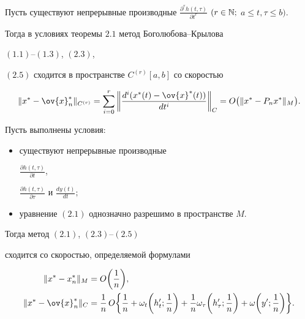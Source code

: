 \begin{thms}


Пусть существуют непрерывные производные $\frac{\partial^r h(t,\tau)}


{\partial t^r}$ $(r\in \bl{N};$ $a\leq t,\tau\leq b)$.


Тогда в условиях теоремы $2.1$ метод Боголюбова--Крылова


$(1.1)$--$(1.3)$, $(2.3)$,


$(2.5)$ сходится в пространстве $C^{(r)}[a,b]$ со скоростью


$$


\|x^*-\ov{x}_n^*\|_{C^{(r)}}=\sum_{i=0}^r\bigg\|\frac{d^i(x^*(t)-


\ov{x}^*(t))}{dt^i}\bigg\|_C=O\bigl(\|x^*-P_nx^*\|_M\bigr).


$$


\end{thms}





\begin{thms}


Пусть выполнены условия\/${:}$


\begin{itemize}


\item[а)] существуют непрерывные производные


$\frac{\partial h(t,\tau)}{\partial t}$,


$\frac{\partial h(t,\tau)}{\partial \tau}$ и $\frac{dy(t)}{dt};$


\item[б)] уравнение $(2.1)$ однозначно разрешимо в пространстве $M$.


\end{itemize}


Тогда метод $(2.1)$, $(2.3)$--$(2.5)$


сходится со скоростью, определяемой формулами


\begin{align}


\|x^*-x_n^*\|_M&=O\bigg(\frac{1}{n}\bigg), \\


%


\|x^*-\ov{x}_n^*\|_C&=\frac{1}{n}\, O\bigg\{\frac{1}{n}+


\omega_t\bigg(h'_t;\frac{1}{n}\bigg)+\frac{1}{n}


\omega_\tau \bigg(h'_\tau;\frac{1}{n}\bigg)+


\omega\bigg(y';\frac{1}{n}\bigg) \bigg\} .


\end{align}


\end{thms}





